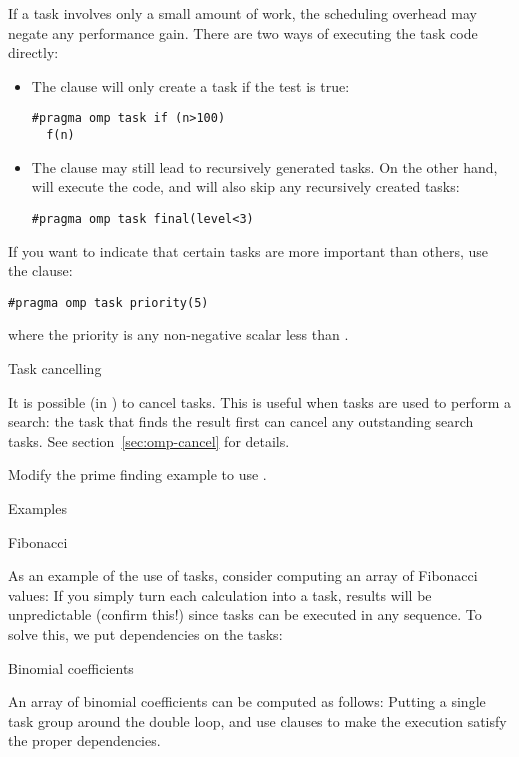 If a task involves only a small amount of work,
the scheduling overhead may negate any performance gain.
There are two ways of executing the task code directly:
\begin{itemize}
\item The  clause will only create a task
  if the test is true:
\begin{lstlisting}
#pragma omp task if (n>100)
  f(n)
\end{lstlisting}
\item The  clause may still lead to recursively
  generated tasks. On the other hand, 
  will execute the code, and will also skip any recursively created tasks:
\begin{lstlisting}
#pragma omp task final(level<3)
\end{lstlisting}
\end{itemize}

If you want to indicate that certain tasks are more important
than others, use the  clause:
\begin{lstlisting}
#pragma omp task priority(5)
\end{lstlisting}
where the priority is any non-negative scalar
less than .

 {Task cancelling}

It is possible (in ) to cancel
tasks. This is useful when tasks are used to perform a search: the
task that finds the result first can cancel any outstanding search
tasks.
See section~\ref{sec:omp-cancel} for details.

\begin{exercise}
  Modify the prime finding example to use .
\end{exercise}

 {Examples}

 {Fibonacci}

As an example of the use of tasks, consider computing an array of Fibonacci values:
%
%
If you simply turn each calculation into a task, results will be
unpredictable (confirm this!) since tasks can be executed in any sequence.
To solve this, we put dependencies on the tasks:
%

 {Binomial coefficients}

\begin{exercise}
  An array of binomial coefficients can be computed as follows:
  Putting a single task group around the double loop, and use
   clauses to make the execution satisfy the proper dependencies.
\end{exercise}

